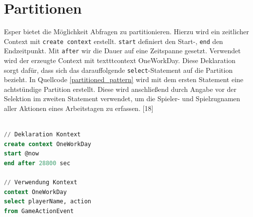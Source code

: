 \section{Partitionen}

Esper bietet die Möglichkeit Abfragen zu partitionieren.
Hierzu wird ein zeitlicher Context mit \texttt{create context} erstellt.
\texttt{start} definiert den Start-, \texttt{end} den Endzeitpunkt.
Mit \texttt{after} wir die Dauer auf eine Zeitspanne gesetzt. Verwendet wird der erzeugte Context mit texttt{context OneWorkDay}. Diese Deklaration sorgt dafür, dass sich das darauffolgende \texttt{select}-Statement auf die Partition bezieht.
In Quellcode \ref{partitioned_pattern} wird mit dem ersten Statement eine achtstündige Partition erstellt. Diese wird anschließend durch Angabe vor der Selektion im zweiten Statement verwendet, um die Spieler- und Spielzugnamen aller Aktionen eines Arbeitstagen zu erfassen.
\cite{EsperRef2018}[18]

\begin{lstlisting}[caption={Partitioniertes Pattern},label=partitioned_pattern,captionpos=b,language=SQL]

// Deklaration Kontext
create context OneWorkDay
start @now 
end after 28800 sec

// Verwendung Kontext
context OneWorkDay 
select playerName, action 
from GameActionEvent

\end{lstlisting}
